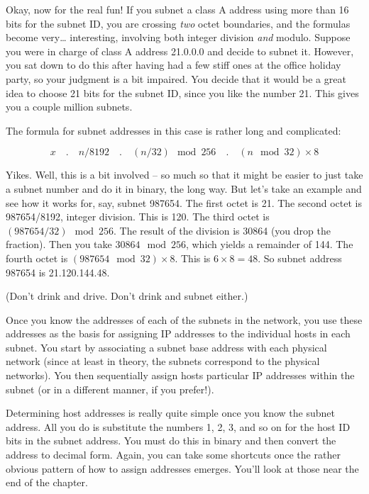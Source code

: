 Okay, now for the real fun! If you subnet a class A address using more
than 16 bits for the subnet ID, you are crossing {\emph{two}} octet
boundaries, and the formulas become very\ldots{} interesting, involving both integer division \emph{and} modulo.
Suppose you were in charge of class A address 21.0.0.0 and decide to subnet it.
However, you sat down to do this after having had a few stiff ones at the office holiday party, so your judgment is a bit impaired.
You decide that it would be a great idea to choose 21 bits for the subnet ID, since you like the number 21.
This gives you a couple million subnets.

The formula for subnet addresses in this case is rather long and complicated:

\[ x \quad.\quad n/8192 \quad.\quad (n/32)\mod 256 \quad.\quad (n\mod 32)\times 8 \]

Yikes.
Well, this is a bit involved -- so much so that it might be easier
to just take a subnet number and do it in binary, the long way. But
let's take an example and see how it works for, say, subnet 987654. The
first octet is 21. The second octet is 987654/8192, integer division.
This is 120. The third octet is $(987654/32)\mod 256$.
The result of the division is 30864 (you drop the fraction).
Then you take $30864\mod 256$, which yields a remainder of 144.
The fourth octet is $(987654\mod 32)\times 8$.
This is $6\times 8 = 48$.
So subnet address 987654 is 21.120.144.48.

(Don't drink and drive. Don't drink and subnet either.)

 

Once you know the addresses of each of the subnets in the network, you
use these addresses as the basis for assigning IP addresses to the
individual hosts in each subnet. You start by associating a subnet base
address with each physical network (since at least in theory, the
subnets correspond to the physical networks). You then sequentially
assign hosts particular IP addresses within the subnet (or in a
different manner, if you prefer!).

Determining host addresses is really quite simple once you know the
subnet address. All you do is substitute the numbers 1, 2, 3, and so on
for the host ID bits in the subnet address. You must do this in binary
and then convert the address to decimal form. Again, you can take some
shortcuts once the rather obvious pattern of how to assign addresses
emerges. You'll look at those near the end of the chapter.




